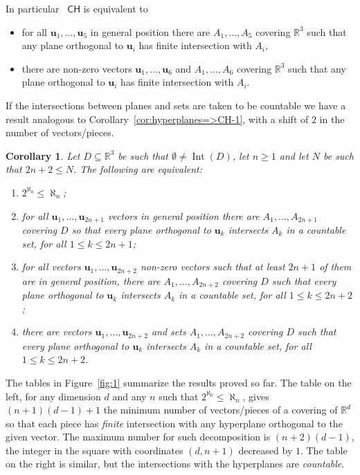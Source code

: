 \documentclass[12pt]{amsart}
\newcommand{\CH}{{\mathsf{CH}}}	%
\DeclareMathOperator{\Int}{Int} 		%
\newcommand{\R}{\mathbb{R}}	%
\theoremstyle{plain}
\newtheorem{corollary}[theorem]{Corollary}
\theoremstyle{definition}
\theoremstyle{remark}
\begin{document}
In particular~\cite{Erdos:1994yq,Simms:1997aa} \( \CH \) is equivalent to 
\begin{itemize}
\item
for all \( \mathbf{u}_1 , \dots , \mathbf{u}_5 \) in general position there are \( A_1 , \dots , A_5 \) covering \( \R^3 \) such that any plane orthogonal to \( \mathbf{u}_i \) has finite intersection with \( A_i \),
\item
there are non-zero vectors \( \mathbf{u}_1 , \dots , \mathbf{u}_6 \) and \( A_1 , \dots , A_6 \) covering \( \R^3 \) such that any plane orthogonal to \( \mathbf{u}_i \) has finite intersection with \( A_i \).
\end{itemize}

If the intersections between planes and sets are taken to be countable we have a result analogous to Corollary~\ref{cor:hyperplanes=>CH-1}, with a shift of \( 2 \) in the number of vectors/pieces.

\begin{corollary}
Let \( D \subseteq \R^3 \) be such that \( \emptyset \neq \Int ( D ) \), let \( n \geq 1 \) and let \( N \) be such that \( 2 n + 2 \leq N \).
The following are equivalent:
\begin{enumerate}[label={\upshape (\alph*)}]
\item
 \( 2^{\aleph_0 } \leq \aleph_n \);
\item
for all \( \mathbf{u}_1 , \dots , \mathbf{u}_{ 2 n + 1} \) vectors in general position there are \( A_1 , \dots , A_{ 2 n + 1 } \) covering \( D\) so that every plane orthogonal to \( \mathbf{u}_k \) intersects \( A_k \) in a countable set, for all \( 1 \leq k \leq 2 n + 1 \);
\item
for all vectors \( \mathbf{u}_1 , \dots , \mathbf{u}_{ 2 n + 2 } \) non-zero vectors such that at least \( 2 n + 1 \) of them are in general position, there are \( A_1 , \dots , A_{ 2 n + 2 } \) covering \( D \) such that every plane orthogonal to \( \mathbf{u}_k \) intersects \( A_k \) in a countable set, for all \( 1 \leq k \leq 2 n + 2 \);
\item
there are vectors \( \mathbf{u}_1 , \dots , \mathbf{u}_{ 2 n + 2 } \) and sets \( A_1 , \dots , A_{ 2 n + 2 } \) covering \( D \) such that every plane orthogonal to \( \mathbf{u}_k \) intersects \( A_k \) in a countable set, for all \( 1 \leq k \leq 2 n + 2 \).
\end{enumerate}
\end{corollary}

The tables in Figure~\ref{fig:1} summarize the results proved so far.
The table on the left, for any dimension \( d \) and any \( n \) such that \( 2^{\aleph_0} \leq \aleph_n \), gives \( ( n + 1 ) ( d - 1 ) + 1 \) the minimum number of vectors/pieces of a covering of \( \R^d \) so that each piece has \emph{finite} intersection with any hyperplane orthogonal to the given vector.
The maximum number for such decomposition is \( ( n + 2 ) ( d - 1 ) \), the integer in the square with coordinates \( ( d , n + 1 ) \) decreased by \( 1 \).
The table on the right is similar, but the intersections with the hyperplanes are \emph{countable}.
\end{document}
